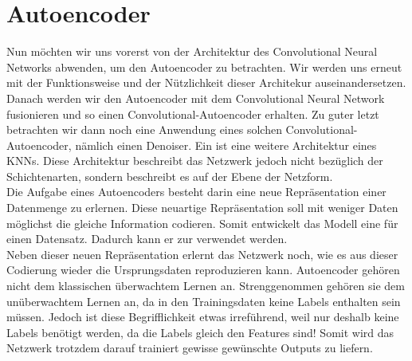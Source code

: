 \chapter{Autoencoder}\label{sec:autoencoder}
Nun möchten wir uns vorerst von der Architektur des Convolutional Neural
Networks abwenden, um den Autoencoder zu betrachten. Wir werden uns erneut
mit der Funktionsweise und der Nützlichkeit dieser Architekur
auseinandersetzen. Danach werden wir den Autoencoder mit dem Convolutional
Neural Network fusionieren und so einen Convolutional-Autoencoder erhalten. Zu
guter letzt betrachten wir dann noch eine Anwendung eines solchen
Convolutional-Autoencoder, nämlich einen Denoiser.
\para{}
\bigskip
Ein  ist eine weitere Architektur eines KNNs. Diese Architektur
beschreibt das Netzwerk jedoch nicht bezüglich der Schichtenarten, sondern beschreibt es
auf der Ebene der Netzform. \\
Die Aufgabe eines Autoencoders besteht darin eine neue Repräsentation einer Datenmenge
zu erlernen. Diese neuartige Repräsentation soll mit weniger Daten möglichst die gleiche
Information codieren. Somit entwickelt das Modell eine  für einen Datensatz. Dadurch kann er zur
 verwendet werden. \\
Neben dieser neuen Repräsentation erlernt das Netzwerk noch, wie es
aus dieser Codierung wieder die Ursprungsdaten reproduzieren kann.
\para{}
Autoencoder gehören nicht dem klassischen überwachtem Lernen an. Strenggenommen gehören
sie dem unüberwachtem Lernen an, da in den Trainingsdaten keine Labels
enthalten sein müssen. Jedoch ist diese Begrifflichkeit etwas irreführend,
weil nur deshalb keine Labels benötigt werden, da die Labels gleich den Features sind!
Somit wird das Netzwerk trotzdem darauf trainiert gewisse gewünschte Outputs
zu liefern.

\cite{book:autoencoder}

